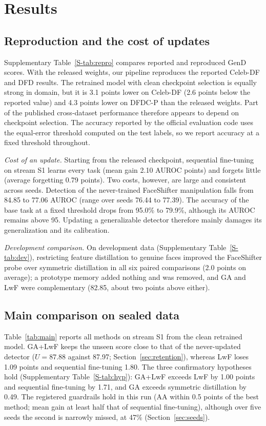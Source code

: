 \documentclass[journal]{IEEEtran}
\begin{document}
\section{Results}
\label{sec:results}

\subsection{Reproduction and the cost of updates}
Supplementary Table~\ref{S-tab:repro} compares reported and reproduced GenD scores. With the released weights, our pipeline reproduces the reported Celeb-DF and DFD results. The retrained model with clean checkpoint selection is equally strong in domain, but it is 3.1 points lower on Celeb-DF (2.6 points below the reported value) and 4.3 points lower on DFDC-P than the released weights. Part of the published cross-dataset performance therefore appears to depend on checkpoint selection. The accuracy reported by the official evaluation code uses the equal-error threshold computed on the test labels, so we report accuracy at a fixed threshold throughout.

\textit{Cost of an update.} Starting from the released checkpoint, sequential fine-tuning on stream S1 learns every task (mean gain 2.10 AUROC points) and forgets little (average forgetting 0.79 points). Two costs, however, are large and consistent across seeds. Detection of the never-trained FaceShifter manipulation falls from 84.85 to 77.06 AUROC (range over seeds 76.44 to 77.39). The accuracy of the base task at a fixed threshold drops from 95.0\% to 79.9\%, although its AUROC remains above 95. Updating a generalizable detector therefore mainly damages its generalization and its calibration.

\textit{Development comparison.} On development data (Supplementary Table~\ref{S-tab:dev}), restricting feature distillation to genuine faces improved the FaceShifter probe over symmetric distillation in all six paired comparisons (2.0 points on average); a prototype memory added nothing and was removed, and GA and LwF were complementary (82.85, about two points above either).

\subsection{Main comparison on sealed data}
Table~\ref{tab:main} reports all methods on stream S1 from the clean retrained model. GA+LwF keeps the unseen score close to that of the never-updated detector ($U=87.88$ against 87.97; Section~\ref{sec:retention}), whereas LwF loses 1.09 points and sequential fine-tuning 1.80. The three confirmatory hypotheses hold (Supplementary Table~\ref{S-tab:hyp}): GA+LwF exceeds LwF by 1.00 points and sequential fine-tuning by 1.71, and GA exceeds symmetric distillation by 0.49. The registered guardrails hold in this run (AA within 0.5 points of the best method; mean gain at least half that of sequential fine-tuning), although over five seeds the second is narrowly missed, at 47\% (Section~\ref{sec:seeds}).
\end{document}
